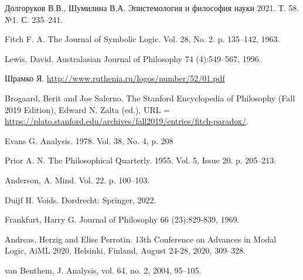 \documentclass[openany]{book}
\theoremstyle{plain}
\theoremstyle{definition}
\begin{document}
\begin{thebibliography}{2}

    Долгоруков В.В., Шумилина В.А.
    \newblock Эпистемология и философия науки 2021. Т. 58. №1. С. 235–241.

    Fitch F. A. 
    \newblock The Journal of Symbolic Logic. Vol. 28, No. 2. p. 135--142, 1963.

    Lewis, David. 
    \newblock Australasian Journal of Philosophy 74 (4):549--567, 1996.

    Шрамко Я. 
    \newblock  \url{http://www.ruthenia.ru/logos/number/52/01.pdf}

    Brogaard, Berit and Joe Salerno.
    \newblock The Stanford Encyclopedia of Philosophy (Fall 2019 Edition), Edward N. Zalta (ed.), URL = \url{https://plato.stanford.edu/archives/fall2019/entries/fitch-paradox/}.

    Evans G. 
    \newblock Analysis. 1978. Vol. 38, No. 4, p. 208

    Prior A. N.
    \newblock The Philosophical Quarterly. 1955. Vol. 5, Issue 20. p. 205--213.

    Anderson, A.
    \newblock Mind. Vol. 22. p. 100--103.

    Duijf H.
    \newblock Voids. Dordrecht: Springer, 2022.

    Frankfurt, Harry G.
    \newblock Journal of Philosophy 66 (23):829-839, 1969.

    Andreas, Herzig and Elise Perrotin.
    \newblock 13th Conference on Advances in Modal Logic, AiML 2020, Helsinki, Finland,
    August 24-28, 2020, 309--328.

    van Benthem, J.
    \newblock Analysis, vol. 64, no. 2, 2004, 95--105.


\end{thebibliography}
\end{document}
